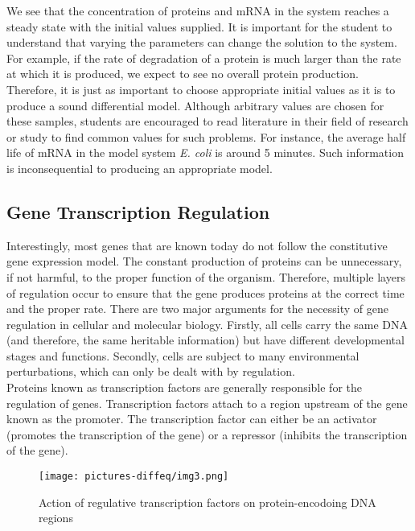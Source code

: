 We see that the concentration of proteins and mRNA in the system reaches a steady state with the initial values supplied. It is important for the student to understand that varying the parameters can change the solution to the system. For example, if the rate of degradation of a protein is much larger than the rate at which it is produced, we expect to see no overall protein production. Therefore, it is just as important to choose appropriate initial values as it is to produce a sound differential model. Although arbitrary values are chosen for these samples, students are encouraged to read literature in their field of research or study to find common values for such problems. For instance, the average half life of mRNA in the model system \textit{E. coli} is around 5 minutes. Such information is inconsequential to producing an appropriate model.

\subsection{Gene Transcription Regulation}

Interestingly, most genes that are known today do not follow the constitutive gene expression model. The constant production of proteins can be unnecessary, if not harmful, to  the proper function of the organism. Therefore, multiple layers of regulation occur to ensure that the gene produces proteins at the correct time and the proper rate. There are two major arguments for the necessity of gene regulation in cellular and molecular biology. Firstly, all cells carry the same DNA (and therefore, the same heritable information) but have different developmental stages and functions. Secondly, cells are subject to many environmental perturbations, which can only be dealt with by regulation.\\

Proteins known as transcription factors are generally responsible for the regulation of genes. Transcription factors attach to a region upstream of the gene known as the promoter. The transcription factor can either be an activator (promotes the transcription of the gene) or a repressor (inhibits the transcription of the gene). 

\begin{figure}[H]
    \centering
    \texttt{[image: pictures-diffeq/img3.png]}
    \caption{Action of regulative transcription factors on protein-encodoing DNA regions}
\end{figure}

